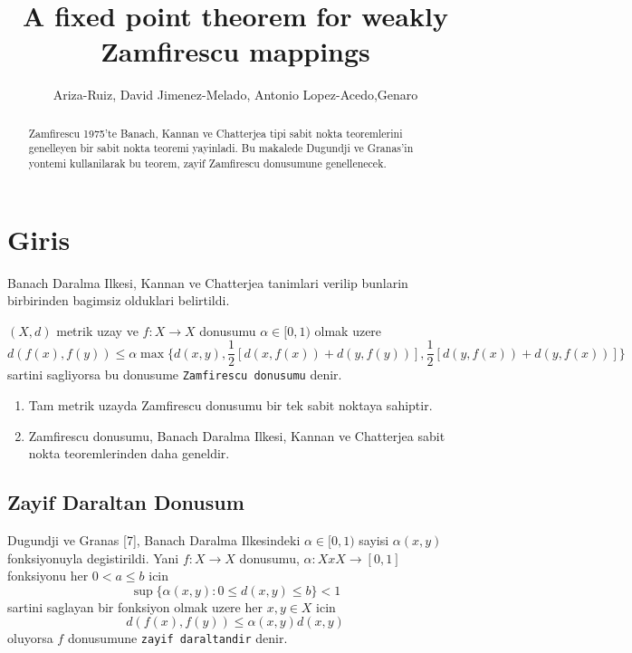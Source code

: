 \documentclass[10pt]{amsart}
\title{A fixed point theorem for weakly Zamfirescu mappings }
\author{Ariza-Ruiz, David Jimenez-Melado, Antonio Lopez-Acedo,Genaro}
\theoremstyle{plain}
\theoremstyle{definition}
\begin{document}
\maketitle

\begin{abstract}
\noindent Zamfirescu 1975'te Banach, Kannan ve Chatterjea tipi sabit nokta teoremlerini genelleyen bir sabit nokta teoremi yayinladi. Bu makalede Dugundji ve Granas'in yontemi kullanilarak bu teorem, zayif Zamfirescu donusumune genellenecek.
\end{abstract}

\section*{Giris}
Banach Daralma Ilkesi, Kannan ve Chatterjea tanimlari verilip bunlarin birbirinden bagimsiz olduklari belirtildi.

 $(X,d)$  metrik uzay ve $f: X \rightarrow X$ donusumu $\alpha \in [0,1)$ olmak uzere 
\begin{equation} 
  d(f(x), f(y))\leq \alpha\max\bigg\{ d(x,y), \frac{1}{2}[d(x,f(x))+d(y,f(y))], \frac{1}{2}[d(y,f(x))+d(y,f(x))] \bigg\} 
\tag*{[Z]}
\end{equation}
sartini sagliyorsa bu donusume \texttt{Zamfirescu donusumu} denir.

\begin{enumerate}
\item  Tam metrik uzayda Zamfirescu donusumu bir tek sabit noktaya sahiptir.
\item  Zamfirescu donusumu, Banach Daralma Ilkesi, Kannan ve Chatterjea sabit nokta teoremlerinden daha geneldir.
\end{enumerate}

\subsection*{Zayif Daraltan Donusum}
  Dugundji ve Granas [7], Banach Daralma Ilkesindeki $\alpha \in [0,1)$ sayisi $\alpha(x,y)$ fonksiyonuyla degistirildi. Yani $f:X \rightarrow X$ donusumu,
 $\alpha :XxX \rightarrow [0,1]$ fonksiyonu her $0<a\leq b$ icin 
\begin{equation*} 
  \sup\big\{\alpha(x,y) : 0\leq d(x,y) \leq b \big\} < 1
\end{equation*}
sartini saglayan bir fonksiyon olmak uzere her $x,y\in X$ icin
\begin{equation*} 
  d(f(x), f(y))\leq \alpha(x,y)d(x,y) 
\end{equation*}
oluyorsa $f$ donusumune \texttt{zayif daraltandir} denir.
\end{document}

